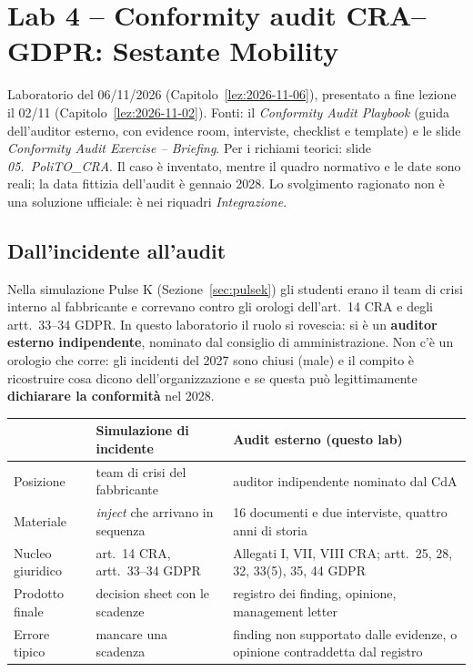 \chapter{Lab 4 -- Conformity audit CRA--GDPR: Sestante Mobility}
\label{lab:04}

\begin{nota}[Fonte]
Laboratorio del 06/11/2026 (Capitolo~\ref{lez:2026-11-06}), presentato a fine lezione il 02/11
(Capitolo~\ref{lez:2026-11-02}). Fonti: il \emph{Conformity Audit Playbook} (guida dell'auditor
esterno, con evidence room, interviste, checklist e template) e le slide \emph{Conformity Audit
Exercise -- Briefing}. Per i richiami teorici: slide \emph{05.~PoliTO\_CRA}. Il caso è inventato,
mentre il quadro normativo e le date sono reali; la data fittizia dell'audit è gennaio 2028.
Lo svolgimento ragionato non è una soluzione ufficiale: è nei riquadri \emph{Integrazione}.
\end{nota}

\section{Dall'incidente all'audit}

Nella simulazione Pulse K (Sezione~\ref{sec:pulsek}) gli studenti erano il team di crisi interno al
fabbricante e correvano contro gli orologi dell'art.~14 CRA e degli artt.~33--34 GDPR. In questo
laboratorio il ruolo si rovescia: si è un \textbf{auditor esterno indipendente}, nominato dal consiglio
di amministrazione. Non c'è un orologio che corre: gli incidenti del 2027 sono chiusi (male) e il
compito è ricostruire cosa dicono dell'organizzazione e se questa può legittimamente
\textbf{dichiarare la conformità} nel 2028.

\begin{center}
\small
\begin{tabularx}{\linewidth}{l X X}
\toprule
 & \textbf{Simulazione di incidente} & \textbf{Audit esterno (questo lab)} \\ \midrule
Posizione   & team di crisi del fabbricante & auditor indipendente nominato dal CdA \\
Materiale   & \emph{inject} che arrivano in sequenza & 16 documenti e due interviste, quattro anni di storia \\
Nucleo giuridico & art.~14 CRA, artt.~33--34 GDPR & Allegati I, VII, VIII CRA; artt.~25, 28, 32, 33(5), 35, 44 GDPR \\
Prodotto finale  & decision sheet con le scadenze & registro dei finding, opinione, management letter \\
Errore tipico & mancare una scadenza & finding non supportato dalle evidenze, o opinione contraddetta dal registro \\
\bottomrule
\end{tabularx}
\end{center}

